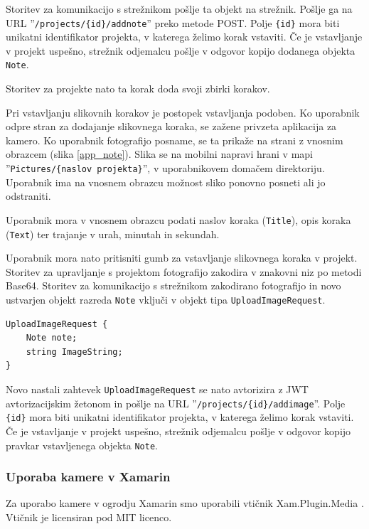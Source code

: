 \documentclass[a4paper, 12pt]{book}
\begin{document}
Storitev za komunikacijo s strežnikom pošlje ta objekt na strežnik.
Pošlje ga na URL ''\texttt{/projects/\{id\}/addnote}'' preko metode POST.
Polje \texttt{\{id\}} mora biti unikatni identifikator projekta, v katerega želimo korak vstaviti.
Če je vstavljanje v projekt uspešno, strežnik odjemalcu pošlje v odgovor kopijo dodanega objekta \texttt{Note}.

Storitev za projekte nato ta korak doda svoji zbirki korakov.

Pri vstavljanju slikovnih korakov je postopek vstavljanja podoben.
Ko uporabnik odpre stran za dodajanje slikovnega koraka, se zažene privzeta aplikacija za kamero.
Ko uporabnik fotografijo posname, se ta prikaže na strani z vnosnim obrazcem (slika \ref{app_note}).
Slika se na mobilni napravi hrani v mapi ''\texttt{Pictures/\{naslov projekta\}}'', v uporabnikovem domačem direktoriju.
Uporabnik ima na vnosnem obrazcu možnost sliko ponovno posneti ali jo odstraniti.

Uporabnik mora v vnosnem obrazcu podati naslov koraka (\texttt{Title}), opis koraka (\texttt{Text}) ter trajanje v urah, minutah in sekundah.

Uporabnik mora nato pritisniti gumb za vstavljanje slikovnega koraka v projekt.
Storitev za upravljanje s projektom fotografijo zakodira v znakovni niz po metodi Base64.
Storitev za komunikacijo s strežnikom zakodirano fotografijo in novo ustvarjen objekt razreda \texttt{Note} vključi v objekt tipa \texttt{UploadImageRequest}.

\begin{Verbatim}[commandchars=+\[\]]
UploadImageRequest {
    Note note;
    string ImageString; 
}
\end{Verbatim}

Novo nastali zahtevek \texttt{UploadImageRequest} se nato avtorizira z JWT avtorizacijskim žetonom in pošlje na URL ''\texttt{/projects/\{id\}/addimage}''.
Polje \texttt{\{id\}} mora biti unikatni identifikator projekta, v katerega želimo korak vstaviti.
Če je vstavljanje v projekt uspešno, strežnik odjemalcu pošlje v odgovor kopijo pravkar vstavljenega objekta \texttt{Note}.


\subsubsection{Uporaba kamere v Xamarin}


Za uporabo kamere v ogrodju Xamarin smo uporabili vtičnik Xam.Plugin.Media \cite{xampluginmedia}.
Vtičnik je licensiran pod MIT licenco.
\end{document}
